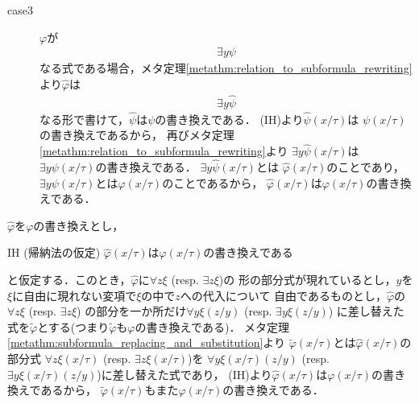 \begin{metaprf}[第一]
\begin{description}
\begin{description}
					\item[case3] $\varphi$が
						\begin{align}
							\exists y \psi
						\end{align}
						なる式である場合，メタ定理\ref{metathm:relation_to_subformula_rewriting}より$\widehat{\varphi}$は
						\begin{align}
							\exists y \widehat{\psi}
						\end{align}
						なる形で書けて，$\widehat{\psi}$は$\psi$の書き換えである．
						(IH)より$\widehat{\psi}(x/\tau)$は
						$\psi(x/\tau)$の書き換えであるから，
						再びメタ定理\ref{metathm:relation_to_subformula_rewriting}より
						$\exists y \widehat{\psi}(x/\tau)$は
						$\exists y \psi(x/\tau)$の書き換えである．
						$\exists y \widehat{\psi}(x/\tau)$とは
						$\widehat{\varphi}(x/\tau)$のことであり，
						$\exists y \psi(x/\tau)$とは$\varphi(x/\tau)$のことであるから，
						$\widehat{\varphi}(x/\tau)$は$\varphi(x/\tau)$の書き換えである．
						\QED
				\end{description}
		\end{description}
	\end{metaprf}
	
	\begin{metaprf}[第二]
		$\widehat{\varphi}$を$\varphi$の書き換えとし，
		\begin{itembox}[l]{IH (帰納法の仮定)}
			$\widehat{\varphi}(x/\tau)$は$\varphi(x/\tau)$の書き換えである
		\end{itembox}
		と仮定する．このとき，$\widehat{\varphi}$に$\forall z \xi$ (resp. $\exists z \xi$)の
		形の部分式が現れているとし，$y$を$\xi$に自由に現れない変項で$\xi$の中で$z$への代入について
		自由であるものとし，$\widehat{\varphi}$の$\forall z \xi$ (resp. $\exists z \xi$)
		の部分を一か所だけ$\forall y \xi(z/y)$ (resp. $\exists y \xi(z/y)$)
		に差し替えた式を$\widetilde{\varphi}$とする(つまり$\widetilde{\varphi}$も$\varphi$の書き換えである)．
		メタ定理\ref{metathm:subformula_replacing_and_substitution}より
		$\widetilde{\varphi}(x/\tau)$とは$\widehat{\varphi}(x/\tau)$の部分式
		$\forall z \xi(x/\tau)$ (resp. $\exists z \xi(x/\tau)$)を
		$\forall y \xi(x/\tau)(z/y)$ (resp. $\exists y \xi(x/\tau)(z/y)$)に差し替えた式であり，
		(IH)より$\widehat{\varphi}(x/\tau)$は$\varphi(x/\tau)$の書き換えであるから，
		$\widetilde{\varphi}(x/\tau)$もまた$\varphi(x/\tau)$の書き換えである．
		\QED
	\end{metaprf}